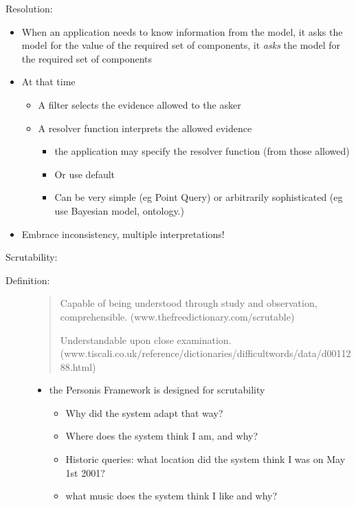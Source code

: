 \documentclass[a4paper,10pt,english]{sphinxmanual}
\begin{document}
Resolution:
\begin{itemize}
\item {} 
When an application needs to know information from the model, it asks the model for the value of the required set of components, it \emph{asks} the model for the required set of components

\item {} 
At that time
\begin{itemize}
\item {} 
A filter selects the evidence allowed to the asker

\item {} 
A resolver function interprets the allowed evidence
\begin{itemize}
\item {} 
the application may specify the resolver function (from those allowed)

\item {} 
Or use default

\item {} 
Can be very simple (eg Point Query) or arbitrarily sophisticated (eg use Bayesian model, ontology.)

\end{itemize}

\end{itemize}

\item {} 
Embrace inconsistency, multiple interpretations!

\end{itemize}

Scrutability:
\begin{description}
\item[{Definition:}] \leavevmode\begin{quote}

Capable of being understood through study and observation, comprehensible.
(www.thefreedictionary.com/scrutable)

Understandable upon close examination. (www.tiscali.co.uk/reference/dictionaries/difficultwords/data/d0011288.html)
\end{quote}
\begin{itemize}
\item {} 
the Personis Framework is designed for scrutability
\begin{itemize}
\item {} 
Why did the system adapt that way?

\item {} 
Where does the system think I am, and why?

\item {} 
Historic queries: what location did the system think I was on May 1st 2001?

\item {} 
what music does the system think I like and why?

\end{itemize}

\end{itemize}

\end{description}
\end{document}
